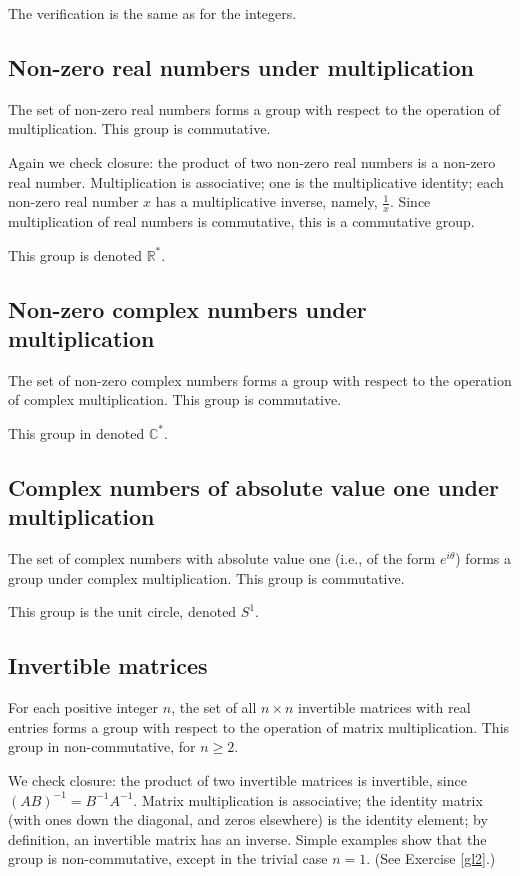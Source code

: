 \documentclass[12pt]{amsbook}
\theoremstyle{plain}
\numberwithin{equation}{chapter}
\numberwithin{theorem}{chapter}
\begin{document}
The verification is the same as for the integers.

\subsection{Non-zero real numbers under multiplication}

The set of non-zero real numbers forms a group with respect to the operation
of multiplication. This group is commutative.

Again we check closure: the product of two non-zero real numbers is a non-zero
real number. Multiplication is associative; one is the multiplicative
identity; each non-zero real number $x$ has a multiplicative inverse, namely,
$\frac{1}{x}$. Since multiplication of real numbers is commutative, this is a
commutative group.

This group is denoted $\mathbb{R}^{*}$.

\subsection{Non-zero complex numbers under multiplication}

The set of non-zero complex numbers forms a group with respect to the
operation of complex multiplication. This group is commutative.

This group in denoted $\mathbb{C}^{*}$.

\subsection{Complex numbers of absolute value one under multiplication}

The set of complex numbers with absolute value one (i.e., of the form
$e^{i\theta}$) forms a group under complex multiplication. This group is commutative.

This group is the unit circle, denoted $S^{1}$.

\subsection{Invertible matrices}

For each positive integer $n$, the set of all $n\times n$ invertible matrices
with real entries forms a group with respect to the operation of matrix
multiplication. This group in non-commutative, for $n\geq2$.

We check closure: the product of two invertible matrices is invertible, since
$\left(  AB\right)  ^{-1}=B^{-1}A^{-1}$. Matrix multiplication is associative;
the identity matrix (with ones down the diagonal, and zeros elsewhere) is the
identity element; by definition, an invertible matrix has an inverse. Simple
examples show that the group is non-commutative, except in the trivial case
$n=1$. (See Exercise \ref{gl2}.)
\end{document}

